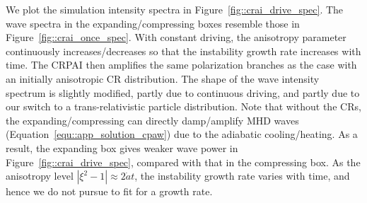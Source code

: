 \documentclass[fleqn,usenatbib]{mnras}
\begin{document}
We plot the simulation intensity spectra in Figure~\ref{fig::crai_drive_spec}. The wave spectra in the expanding/compressing boxes resemble those in Figure~\ref{fig::crai_once_spec}. 
With constant driving, the anisotropy parameter continuously increases/decreases so that the instability growth rate increases with time. The CRPAI then amplifies the same polarization branches as the case with an initially anisotropic CR distribution. The shape of the wave intensity spectrum is slightly modified, partly due to continuous driving, and partly due to our switch to a trans-relativistic particle distribution.
Note that without the CRs, the expanding/compressing can directly damp/amplify MHD waves (Equation~\ref{equ::app_solution_cpaw}) due to the adiabatic cooling/heating. As a result,
the expanding box gives weaker wave power in Figure~\ref{fig::crai_drive_spec}, compared with that in the compressing box. As the anisotropy level $|\xi^2 - 1| \approx 2 \dot{a}t$, the instability growth rate varies with time, and hence we do not pursue to fit for a growth rate.
\end{document}
